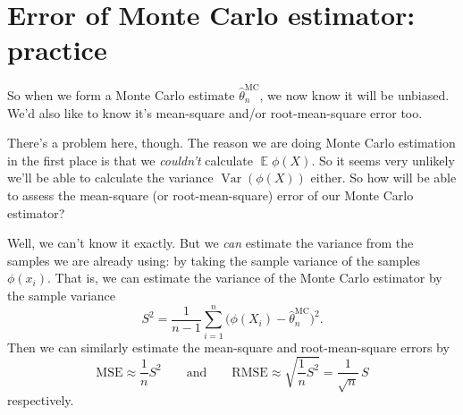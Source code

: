 \documentclass[
  letterpaper,
  DIV=11,
  numbers=noendperiod]{scrreprt}
\newcommand{\Exg}{\operatorname{\mathbb{E}}}
\theoremstyle{plain}
\theoremstyle{definition}
\theoremstyle{definition}
\theoremstyle{remark}
\begin{document}
\section{Error of Monte Carlo estimator:
practice}\label{error-of-monte-carlo-estimator-practice}

So when we form a Monte Carlo estimate \(\hat\theta_n^{\text{MC}}\), we
now know it will be unbiased. We'd also like to know it's mean-square
and/or root-mean-square error too.

There's a problem here, though. The reason we are doing Monte Carlo
estimation in the first place is that we \emph{couldn't} calculate
\(\Exg \phi(X)\). So it seems very unlikely we'll be able to calculate
the variance \(\operatorname{Var}(\phi(X))\) either. So how will be able
to assess the mean-square (or root-mean-square) error of our Monte Carlo
estimator?

Well, we can't know it exactly. But we \emph{can} estimate the variance
from the samples we are already using: by taking the sample variance of
the samples \(\phi(x_i)\). That is, we can estimate the variance of the
Monte Carlo estimator by the sample variance
\[ S^2 = \frac{1}{n-1} \sum_{i=1}^n \big(\phi(X_i) - \widehat{\theta}_n^{\mathrm{MC}} \big)^2 . \]
Then we can similarly estimate the mean-square and root-mean-square
errors by
\[ \text{MSE} \approx \frac{1}{n}S^2 \qquad \text{and} \qquad \text{RMSE} \approx \sqrt{\frac{1}{n} S^2} = \frac{1}{\sqrt{n}}\,S  \]
respectively.
\end{document}
